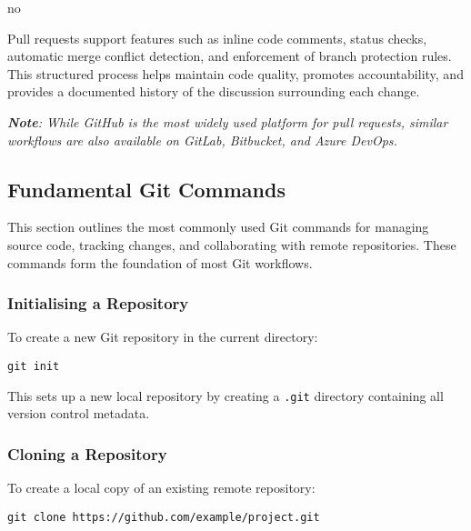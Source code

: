 no\documentclass{article}
\newcommand{\codecmd}[1]{\textcolor[rgb]{0,0.5,0}{\texttt{#1}}}
\begin{document}
Pull requests support features such as inline code comments, status checks, automatic merge conflict detection, and enforcement of branch protection rules. This structured process helps maintain code quality, promotes accountability, and provides a documented history of the discussion surrounding each change.

\medskip
\textit{\textbf{Note}: While GitHub is the most widely used platform for pull requests, similar workflows are also available on GitLab, Bitbucket, and Azure DevOps.}



\subsection{Fundamental Git Commands}

This section outlines the most commonly used Git commands for managing source code, tracking changes, and collaborating with remote repositories. These commands form the foundation of most Git workflows.

\subsubsection{Initialising a Repository}

To create a new Git repository in the current directory:

\begin{tcolorbox}[colback=mintgreen, colframe=green!40!black, boxrule=0.5pt, sharp corners]
\begin{verbatim}
git init
\end{verbatim}
\end{tcolorbox}

\noindent This sets up a new local repository by creating a \codecmd{.git} directory containing all version control metadata.

\subsubsection{Cloning a Repository}

To create a local copy of an existing remote repository:

\begin{tcolorbox}[colback=mintgreen, colframe=green!40!black, boxrule=0.5pt, sharp corners]
\begin{verbatim}
git clone https://github.com/example/project.git
\end{verbatim}
\end{tcolorbox}
\end{document}
